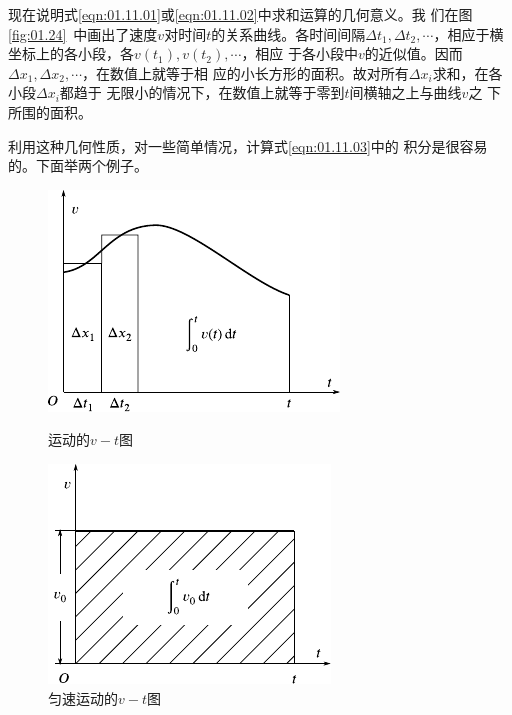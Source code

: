 现在说明式\eqref{eqn:01.11.01}或\eqref{eqn:01.11.02}中求和运算的几何意义。我
们在图\ref{fig:01.24}~中画出了速度$v$对时间$t$的关系曲线。各时间间隔$\Delta t_1 , \Delta t_2 , \cdots$，相应于横坐标上的各小段，各$v\left(t_1\right) , v\left(t_2\right) , \cdots$，相应
于各小段中$ v $的近似值。因而$\Delta x_1 , \Delta x_2 , \cdots$，在数值上就等于相
应的小长方形的面积。故对所有$\Delta x_i$求和，在各小段$\Delta x_i$都趋于
无限小的情况下，在数值上就等于零到$t$间横轴之上与曲线$v$之
下所围的面积。

利用这种几何性质，对一些简单情况，计算式\eqref{eqn:01.11.03}中的
积分是很容易的。下面举两个例子。

\begin{figure}[!h]
 \begin{minipage}[b]{14em}
 \centering
 \includegraphics[width=0.8\linewidth]{figure/fig01.24}
 \caption{运动的$v-t$图}
 \label{fig:01.24}
 \end{minipage}\hfill
 \begin{minipage}[b]{14em}
 \centering
 \includegraphics[width=0.8\linewidth]{figure/fig01.25}
 \caption{匀速运动的$v-t$图}
 \label{fig:01.25}
 \end{minipage}
\end{figure}

